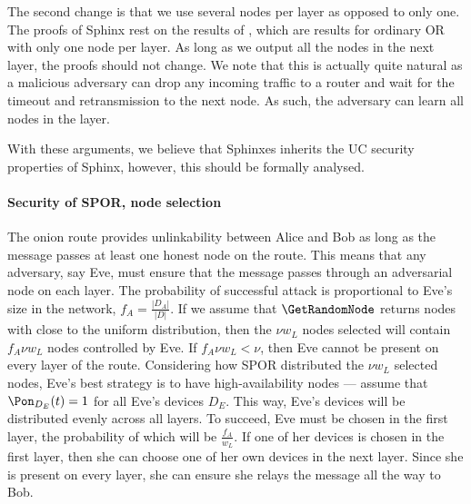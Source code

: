 The second change is that we use several nodes per layer as opposed to only 
one.
The proofs of Sphinx rest on the results of \textcite{CLOnionRouting}, which 
are results for ordinary \ac{OR} with only one node per layer.
As long as we output all the nodes in the next layer, the proofs should not 
change.
We note that this is actually quite natural as a malicious adversary can drop 
any incoming traffic to a router and wait for the timeout and retransmission to 
the next node.
As such, the adversary can learn all nodes in the layer.

With these arguments, we believe that Sphinxes inherits the \ac{UC} security 
properties of Sphinx, however, this should be formally analysed.

\paragraph*{Security of \acs*{SPOR}, node selection}

The onion route provides unlinkability between Alice and Bob as long as the 
message passes at least one honest node on the route.
This means that any adversary, say Eve,  must ensure that the message passes 
through an adversarial node on each layer.
The probability of successful attack is proportional to Eve's size in the 
network, \ie \(f_A = \frac{|D_A|}{|D|}\).
If we assume that \(\GetRandomNode\) returns nodes with close to the uniform 
distribution, then the \(\nu w_L\) nodes selected will contain \(f_A \nu w_L\) 
nodes controlled by Eve.
If \(f_A \nu w_L < \nu\), then Eve cannot be present on every layer of the 
route.
Considering how \ac{SPOR} distributed the \(\nu w_L\) selected nodes, Eve's 
best strategy is to have high-availability nodes --- assume that 
\(\Pon_{D_E}(t) = 1\) for all Eve's devices \(D_E\).
This way, Eve's devices will be distributed evenly across all layers.
To succeed, Eve must be chosen in the first layer, the probability of which 
will be \(\frac{f_A}{w_L}\).
If one of her devices is chosen in the first layer, then she can choose one of 
her own devices in the next layer.
Since she is present on every layer, she can ensure she relays the message all 
the way to Bob. 

